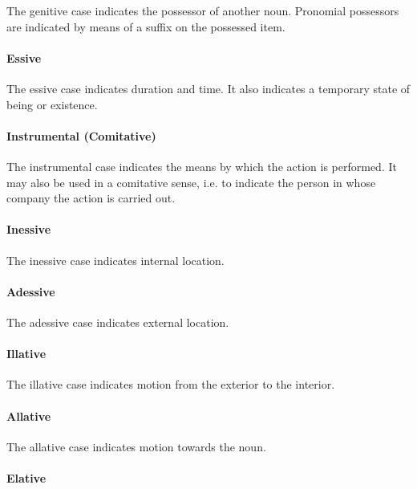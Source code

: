 \documentclass[grammar]{subfiles}
\begin{document}
	The genitive case indicates the possessor of another noun. Pronomial possessors are indicated by means of a suffix on the possessed item.

	\paragraph{Essive}
	\label{par:nm_essive_case}

	The essive case indicates duration and time. It also indicates a temporary state of being or existence.

	\paragraph{Instrumental (Comitative)}
	\label{par:nm_instrumental_case}

	The instrumental case indicates the means by which the action is performed. It may also be used in a comitative sense, i.e. to indicate the person in whose company the action is carried out.

	\paragraph{Inessive}
	\label{par:nm_inessive_case}

	The inessive case indicates internal location. 

	\paragraph{Adessive}
	\label{par:nm_adessive_case}

	The adessive case indicates external location.

	\paragraph{Illative}
	\label{par:nm_illative_case}

	The illative case indicates motion from the exterior to the interior.

	\paragraph{Allative}
	\label{par:nm_allative_case}

	The allative case indicates motion towards the noun.

	\paragraph{Elative}
	\label{par:nm_elative_case}
\end{document}
